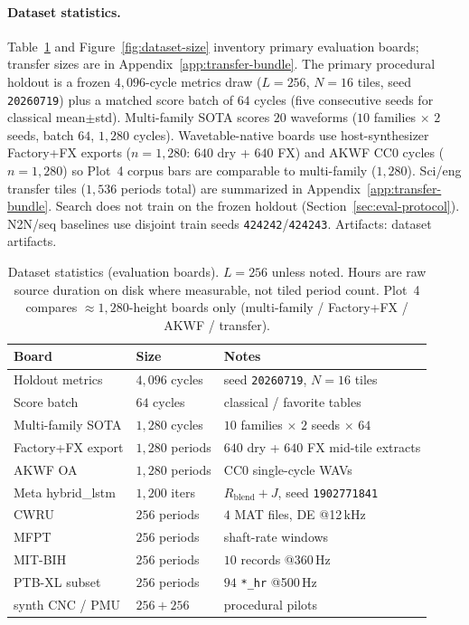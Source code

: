 \paragraph{Dataset statistics.}
Table~\ref{tab:dataset-stats} and Figure~\ref{fig:dataset-size} inventory primary evaluation boards; transfer sizes are in Appendix~\ref{app:transfer-bundle}.
The primary procedural holdout is a frozen $4{,}096$-cycle metrics draw ($L{=}256$, $N{=}16$ tiles, seed \texttt{20260719}) plus a matched score batch of $64$ cycles (five consecutive seeds for classical mean$\pm$std).
Multi-family SOTA scores $20$ waveforms ($10$ families $\times$ $2$ seeds, batch $64$, $1{,}280$ cycles).
Wavetable-native boards use host-synthesizer Factory+FX exports ($n{=}1{,}280$: $640$ dry + $640$ FX) and AKWF CC0 cycles ($n{=}1{,}280$) so Plot~4 corpus bars are comparable to multi-family ($1{,}280$).
Sci/eng transfer tiles ($1{,}536$ periods total) are summarized in Appendix~\ref{app:transfer-bundle}.
Search does not train on the frozen holdout (Section~\ref{sec:eval-protocol}). N2N/seq baselines use disjoint train seeds \texttt{424242}/\texttt{424243}.
Artifacts: dataset artifacts.

\begin{table}[tbp]
  \centering
  \caption{Dataset statistics (evaluation boards).
    $L{=}256$ unless noted. Hours are raw source duration on disk where measurable, not tiled period count.
    Plot~4 compares ${\approx}1{,}280$-height boards only (multi-family / Factory+FX / AKWF / transfer).}
  \label{tab:dataset-stats}
  \setlength{\tabcolsep}{3pt}
\begin{tabular}{@{}llp{}@{}}
    \toprule
    Board & Size & Notes \\
    \midrule
    Holdout metrics & $4{,}096$ cycles & seed \texttt{20260719}, $N{=}16$ tiles \\
    Score batch & $64$ cycles & classical / favorite tables \\
    Multi-family SOTA & $1{,}280$ cycles & $10$ families $\times$ $2$ seeds $\times$ $64$ \\
    Factory+FX export & $1{,}280$ periods & $640$ dry + $640$ FX mid-tile extracts \\
    AKWF OA & $1{,}280$ periods & CC0 single-cycle WAVs \\
    Meta hybrid\_lstm & $1{,}200$ iters & $R_{\mathrm{blend}}{+}J$, seed \texttt{1902771841} \\
    CWRU & $256$ periods & $4$ MAT files, DE @12\,kHz \\
    MFPT & $256$ periods & shaft-rate windows \\
    MIT-BIH & $256$ periods & $10$ records @360\,Hz \\
    PTB-XL subset & $256$ periods & $94$ \texttt{*\_hr} @500\,Hz \\
    synth CNC / PMU & $256{+}256$ & procedural pilots \\
    \bottomrule
  \end{tabular}
\end{table}


